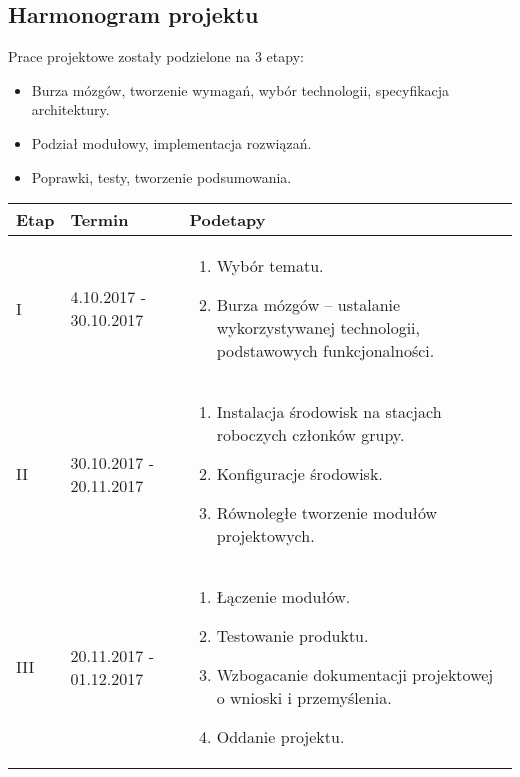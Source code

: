 \subsection{Harmonogram projektu}

Prace projektowe zostały podzielone na 3 etapy:
\begin{itemize}
	\item Burza mózgów, tworzenie wymagań, wybór technologii, specyfikacja architektury. 
	\item Podział modułowy, implementacja rozwiązań.
	\item Poprawki, testy, tworzenie podsumowania.
\end{itemize}

\begin{tabularx}{\textwidth}{|l|l|l|}
	\hline
	Etap & Termin & Podetapy \tabularnewline \hline
	I & 4.10.2017 - 30.10.2017 &
		\begin{enumerate}
			\item Wybór tematu.
			\item Burza mózgów – ustalanie wykorzystywanej technologii, podstawowych funkcjonalności. 
		\end{enumerate}
		\tabularnewline \hline
	II & 30.10.2017 - 20.11.2017 &
	\begin{enumerate}
		\item Instalacja środowisk na stacjach roboczych członków grupy.
		\item Konfiguracje środowisk.
		\item Równoległe tworzenie modułów projektowych.
	\end{enumerate}
	\tabularnewline \hline
	III & 20.11.2017 - 01.12.2017 &
	\begin{enumerate}
		\item Łączenie modułów.
		\item Testowanie produktu.
		\item Wzbogacanie dokumentacji projektowej o wnioski i przemyślenia.
		\item Oddanie projektu.
	\end{enumerate}
	\tabularnewline \hline
\end{tabularx}
